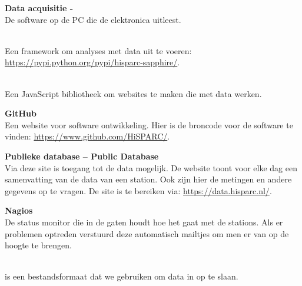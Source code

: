 \textbf{Data acquisitie - \hisparc\daq} \\
De software op de \hisparc PC die de \hisparc elektronica uitleest.

\textbf{\sapphire} \\
Een \python framework om analyses met \hisparc data uit te voeren:
\url{https://pypi.python.org/pypi/hisparc-sapphire/}.

\textbf{\jsparc} \\
Een JavaScript bibliotheek om websites te maken die met \hisparc data
werken.

\textbf{GitHub} \\
Een website voor software ontwikkeling. Hier is de broncode voor de
\hisparc software te vinden: \url{https://www.github.com/HiSPARC/}.

\textbf{Publieke database -- Public Database} \\
Via deze site is toegang tot de \hisparc data mogelijk. De website toont
voor elke dag een samenvatting van de data van een station. Ook zijn
hier de metingen en andere gegevens op te vragen. De site is te bereiken
via: \url{https://data.hisparc.nl/}.

\textbf{Nagios} \\
De status monitor die in de gaten houdt hoe het gaat met de stations.
Als er problemen optreden verstuurd deze automatisch mailtjes om men er
van op de hoogte te brengen.

\textbf{\hdf} \\
\hdf is een bestandsformaat dat we gebruiken om data in op te slaan.


